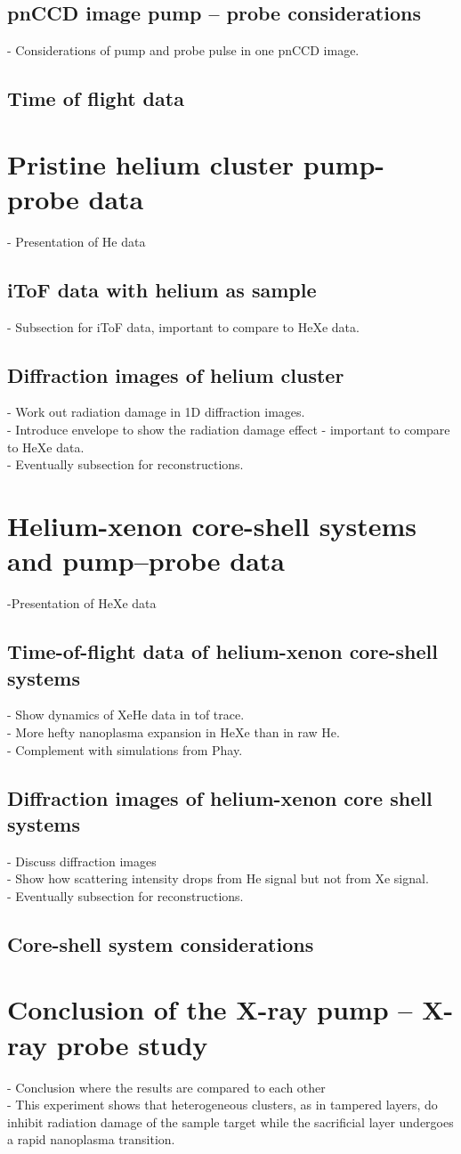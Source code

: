 \subsection{pnCCD image pump -- probe considerations}
- Considerations of pump and probe pulse in one pnCCD image.
\subsection{Time of flight data}
\section{Pristine helium cluster pump-probe data}
- Presentation of He data
\subsection{iToF data with helium as sample}
- Subsection for iToF data, important to compare to HeXe data.
\subsection{Diffraction images of helium cluster}
- Work out radiation damage in 1D diffraction images.\\
- Introduce envelope to show the radiation damage effect - important to compare to HeXe data.\\
- Eventually subsection for reconstructions.
\section{Helium-xenon core-shell systems and pump--probe data}
-Presentation of HeXe data
\subsection{Time-of-flight data of helium-xenon core-shell systems}
- Show dynamics of XeHe data in tof trace.\\
- More hefty nanoplasma expansion in HeXe than in raw He.\\
- Complement with simulations from Phay.
\subsection{Diffraction images of helium-xenon core shell systems}
- Discuss diffraction images\\
- Show how scattering intensity drops from He signal but not from Xe signal.\\
- Eventually subsection for reconstructions.
\subsection{Core-shell system considerations}
\section{Conclusion of the X-ray pump -- X-ray probe study}
- Conclusion where the results are compared to each other\\
- This experiment shows that heterogeneous clusters, as in tampered layers, do inhibit radiation damage of the sample target while the sacrificial layer undergoes a rapid nanoplasma transition.